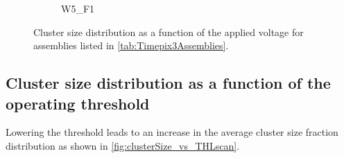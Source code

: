 \begin{figure}[htbp]
\begin{subfigure}[b]{0.33\textwidth}
    \caption{W5\_F1}
  \end{subfigure}%
  \caption{Cluster size distribution as a function of the applied
    voltage for assemblies listed in \cref{tab:Timepix3Assemblies}.}
  \label{fig:clusterSize_vs_biasVoltage}
\end{figure}

\newpage
\subsection{Cluster size distribution as a function of the operating
  threshold}

Lowering the threshold leads to an increase in the average cluster
size fraction distribution as shown in
\cref{fig:clusterSize_vs_THLscan}.

